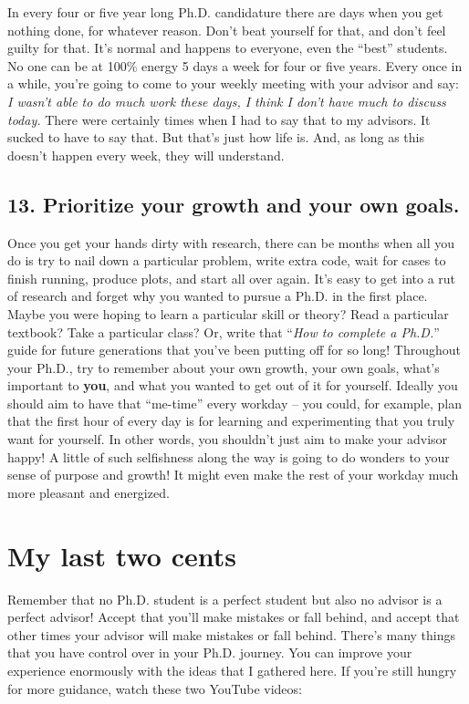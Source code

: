 \documentclass[10pt,twocolumn]{article}
\begin{document}
In every four or five year long Ph.D. candidature there are days when you get nothing done, for whatever reason. Don’t beat yourself for that, and don’t feel guilty for that. It’s normal and happens to everyone, even the “best” students. No one can be at 100\% energy 5 days a week for four or five years. Every once in a while, you’re going to come to your weekly meeting with your advisor and say: \textit{I wasn’t able to do much work these days, I think I don’t have much to discuss today.} There were certainly times when I had to say that to my advisors. It sucked to have to say that. But that’s just how life is. And, as long as this doesn’t happen every week, they will understand.

\subsection*{13. Prioritize your growth and your own goals.}

Once you get your hands dirty with research, there can be months when all you do is try to nail down a particular problem, write extra code, wait for cases to finish running, produce plots, and start all over again. It’s easy to get into a rut of research and forget why you wanted to pursue a Ph.D. in the first place. Maybe you were hoping to learn a particular skill or theory? Read a particular textbook? Take a particular class? Or, write that “\textit{How to complete a Ph.D.}” guide for future generations that you’ve been putting off for so long! Throughout your Ph.D., try to remember about your own growth, your own goals, what's important to \textbf{you}, and what you wanted to get out of it for yourself. Ideally you should aim to have that “me-time” every workday – you could, for example, plan that the first hour of every day is for learning and experimenting that you truly want for yourself. In other words, you shouldn’t just aim to make your advisor happy! A little of such selfishness along the way is going to do wonders to your sense of purpose and growth! It might even make the rest of your workday much more pleasant and energized.

\section*{My last two cents}

Remember that no Ph.D. student is a perfect student but also no advisor is a perfect advisor! Accept that you’ll make mistakes or fall behind, and accept that other times your advisor will make mistakes or fall behind. There’s many things that you have control over in your Ph.D. journey. You can improve your experience enormously with the ideas that I gathered here. If you’re still hungry for more guidance, watch these two YouTube videos:
\end{document}
